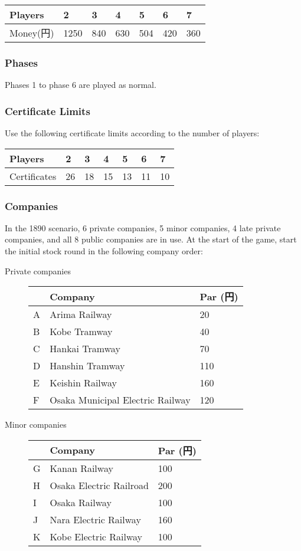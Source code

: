 \begin{multicols}{2}
\begin{tabular}{l|llllll}
Players & 2 & 3 & 4 & 5 & 6 & 7 \\ \hline
Money(円) & 1250 & 840 & 630 & 504 & 420 & 360
\end{tabular}

\subsubsection{Phases}

Phases 1 to phase 6 are played as normal.

\subsubsection{Certificate Limits}
Use the following certificate limits according to the number of players:

\begin{tabular}{l|llllll}
Players & 2 & 3 & 4 & 5 & 6 & 7\\
\hline
Certificates & 26 & 18 & 15 & 13 & 11 & 10 \\
\end{tabular}

\subsubsection{Companies}

In the 1890 scenario, 6 private companies, 5 minor companies, 4 late
private companies, and all 8 public companies are in use. At the start
of the game, start the initial stock round in the following company
order:

\begin{description}
\item[Private companies] \hfill

\begin{tabular}{lp{3cm}l}
 & Company & Par (円) \\
\hline
A & Arima Railway & 20\\
B & Kobe Tramway & 40\\
C & Hankai Tramway & 70 \\
D & Hanshin Tramway & 110\\
E & Keishin Railway & 160\\
F & Osaka Municipal Electric Railway & 120
\end{tabular}
\item[Minor companies] \hfill

\begin{tabular}{lll}
 & Company & Par (円) \\
\hline
G & Kanan Railway & 100\\
H & Osaka Electric Railroad & 200\\
I & Osaka Railway & 100 \\
J & Nara Electric Railway & 160\\
K & Kobe Electric Railway & 100
\end{tabular}
\end{description}


\end{multicols}

